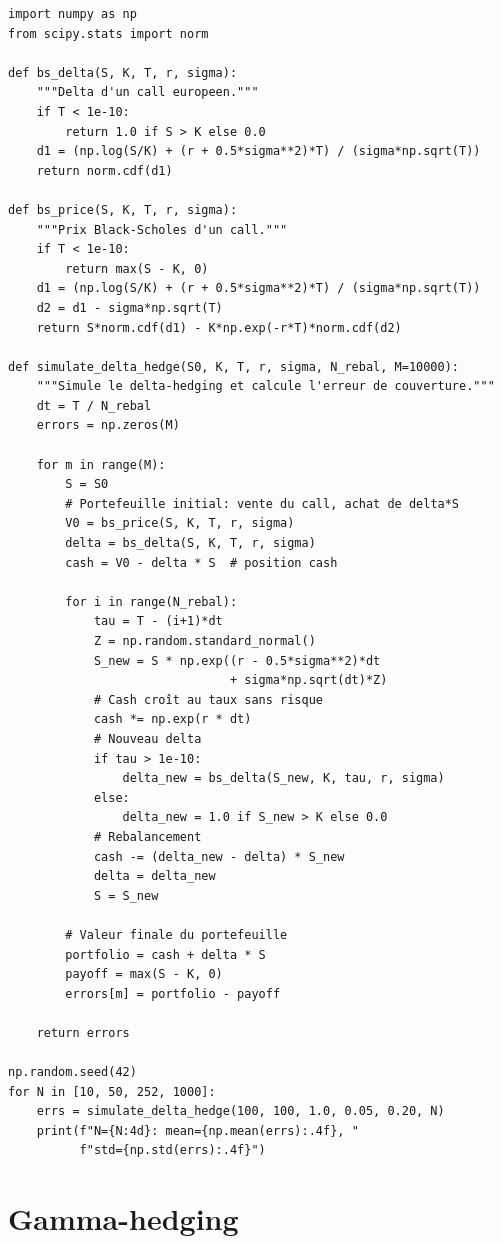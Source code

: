 \begin{codeblock}[title=\textbf{Simulation du delta-hedging discret}]
\begin{verbatim}
import numpy as np
from scipy.stats import norm

def bs_delta(S, K, T, r, sigma):
    """Delta d'un call europeen."""
    if T < 1e-10:
        return 1.0 if S > K else 0.0
    d1 = (np.log(S/K) + (r + 0.5*sigma**2)*T) / (sigma*np.sqrt(T))
    return norm.cdf(d1)

def bs_price(S, K, T, r, sigma):
    """Prix Black-Scholes d'un call."""
    if T < 1e-10:
        return max(S - K, 0)
    d1 = (np.log(S/K) + (r + 0.5*sigma**2)*T) / (sigma*np.sqrt(T))
    d2 = d1 - sigma*np.sqrt(T)
    return S*norm.cdf(d1) - K*np.exp(-r*T)*norm.cdf(d2)

def simulate_delta_hedge(S0, K, T, r, sigma, N_rebal, M=10000):
    """Simule le delta-hedging et calcule l'erreur de couverture."""
    dt = T / N_rebal
    errors = np.zeros(M)

    for m in range(M):
        S = S0
        # Portefeuille initial: vente du call, achat de delta*S
        V0 = bs_price(S, K, T, r, sigma)
        delta = bs_delta(S, K, T, r, sigma)
        cash = V0 - delta * S  # position cash

        for i in range(N_rebal):
            tau = T - (i+1)*dt
            Z = np.random.standard_normal()
            S_new = S * np.exp((r - 0.5*sigma**2)*dt
                               + sigma*np.sqrt(dt)*Z)
            # Cash croît au taux sans risque
            cash *= np.exp(r * dt)
            # Nouveau delta
            if tau > 1e-10:
                delta_new = bs_delta(S_new, K, tau, r, sigma)
            else:
                delta_new = 1.0 if S_new > K else 0.0
            # Rebalancement
            cash -= (delta_new - delta) * S_new
            delta = delta_new
            S = S_new

        # Valeur finale du portefeuille
        portfolio = cash + delta * S
        payoff = max(S - K, 0)
        errors[m] = portfolio - payoff

    return errors

np.random.seed(42)
for N in [10, 50, 252, 1000]:
    errs = simulate_delta_hedge(100, 100, 1.0, 0.05, 0.20, N)
    print(f"N={N:4d}: mean={np.mean(errs):.4f}, "
          f"std={np.std(errs):.4f}")
\end{verbatim}
\end{codeblock}

\section{Gamma-hedging}

